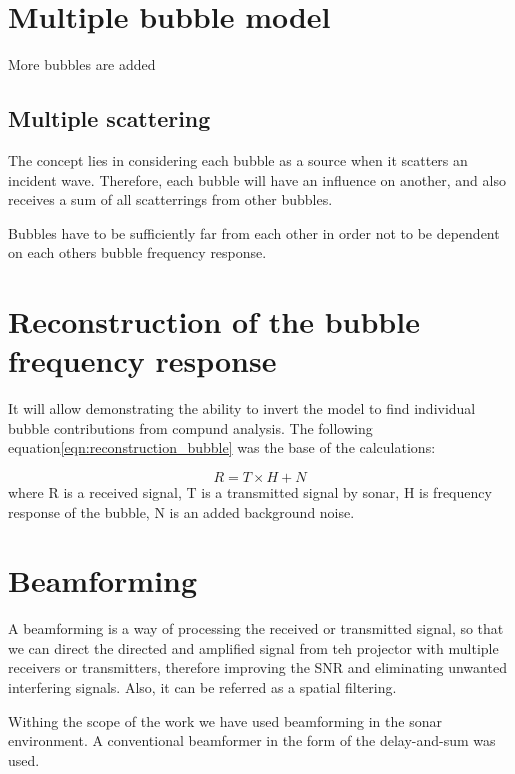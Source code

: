 \section{Multiple bubble model}

More bubbles are added

\subsection{Multiple scattering }
The concept lies in considering each bubble as a source when it scatters an incident wave. 
Therefore, each bubble will have an influence on another, and also receives a sum of all scatterrings from 
other bubbles. 

Bubbles have to be sufficiently far from each other in order not to be dependent on each others bubble frequency response.

\section{Reconstruction of the bubble frequency response}

It will allow demonstrating the ability to invert the model to find individual bubble contributions from compund analysis.
The following equation\ref{eqn:reconstruction_bubble} was the base of the calculations:

\begin{equation}\label{eqn:reconstruction_bubble}
    R = T \times H + N
\end{equation}
where R is a received signal, T is a transmitted signal by sonar, H is frequency response of the bubble, N is an added background noise.

\section{Beamforming}

A beamforming is a way of processing the received or transmitted signal, so that we can direct the directed and amplified signal from teh projector with multiple receivers or transmitters, therefore improving the SNR and eliminating unwanted interfering signals. Also, it can be referred as a spatial filtering.

Withing the scope of the work we have used beamforming in the sonar environment. A conventional beamformer in the form of the delay-and-sum was used. 

